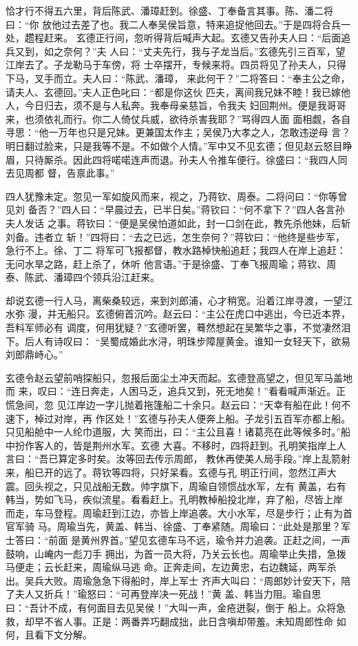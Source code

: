 恰才行不得五六里，背后陈武、潘璋赶到。徐盛、丁奉备言其事。陈、潘二将曰：“你
放他过去差了也。我二人奉吴侯旨意，特来追捉他回去。”于是四将合兵一处，趱程赶来。
玄德正行间，忽听得背后喊声大起。玄德又告孙夫人曰：“后面追兵又到，如之奈何？”夫
人曰：“丈夫先行，我与子龙当后。”玄德先引三百军，望江岸去了。子龙勒马于车傍，将
士卒摆开，专候来将。四员将见了孙夫人，只得下马，叉手而立。夫人曰：“陈武、潘璋，
来此何干？”二将答曰：“奉主公之命，请夫人、玄德回。”夫人正色叱曰：“都是你这伙
匹夫，离间我兄妹不睦！我已嫁他人，今日归去，须不是与人私奔。我奉母亲慈旨，令我夫
妇回荆州。便是我哥哥来，也须依礼而行。你二人倚仗兵威，欲待杀害我耶？”骂得四人面
面相觑，各自寻思：“他一万年也只是兄妹。更兼国太作主；吴侯乃大孝之人，怎敢违逆母
言？明日翻过脸来，只是我等不是。不如做个人情。”军中又不见玄德；但见赵云怒目睁
眉，只待厮杀。因此四将喏喏连声而退。孙夫人令推车便行。徐盛曰：“我四人同去见周都
督，告禀此事。”

四人犹豫未定。忽见一军如旋风而来，视之，乃蒋钦、周泰。二将问曰：“你等曾见刘
备否？”四人曰：“早晨过去，已半日矣。”蒋钦曰：“何不拿下？”四人各言孙夫人发话
之事。蒋钦曰：“便是吴侯怕道如此，封一口剑在此，教先杀他妹，后斩刘备。违者立
斩！”四将曰：“去之已远，怎生奈何？”蒋钦曰：“他终是些步军，急行不上。徐、丁二
将军可飞报都督，教水路棹快船追赶；我四人在岸上追赶：无问水旱之路，赶上杀了，休听
他言语。”于是徐盛、丁奉飞报周瑜；蒋钦、周泰、陈武、潘璋四个领兵沿江赶来。

却说玄德一行人马，离柴桑较远，来到刘郎浦，心才稍宽。沿着江岸寻渡，一望江水弥
漫，并无船只。玄德俯首沉吟。赵云曰：“主公在虎口中逃出，今已近本界，吾料军师必有
调度，何用犹疑？”玄德听罢，蓦然想起在吴繁华之事，不觉凄然泪下。后人有诗叹曰：
“吴蜀成婚此水浔，明珠步障屋黄金。谁知一女轻天下，欲易刘郎鼎峙心。”

玄德令赵云望前哨探船只，忽报后面尘土冲天而起。玄德登高望之，但见军马盖地而
来，叹曰：“连日奔走，人困马乏，追兵又到，死无地矣！”看看喊声渐近。正慌急间，忽
见江岸边一字儿抛着拖篷船二十余只。赵云曰：“天幸有船在此！何不速下，棹过对岸，再
作区处！”玄德与孙夫人便奔上船。子龙引五百军亦都上船。只见船舱中一人纶巾道服，大
笑而出，曰：“主公且喜！诸葛亮在此等候多时。”船中扮作客人的，皆是荆州水军。玄德
大喜。不移时，四将赶到。孔明笑指岸上人言曰：“吾已算定多时矣。汝等回去传示周郎，
教休再使美人局手段。”岸上乱箭射来，船已开的远了。蒋钦等四将，只好呆看。玄德与孔
明正行间，忽然江声大震。回头视之，只见战船无数。帅字旗下，周瑜自领惯战水军，左有
黄盖，右有韩当，势如飞马，疾似流星。看看赶上。孔明教棹船投北岸，弃了船，尽皆上岸
而走，车马登程。周瑜赶到江边，亦皆上岸追袭。大小水军，尽是步行；止有为首官军骑
马。周瑜当先，黄盖、韩当、徐盛、丁奉紧随。周瑜曰：“此处是那里？军士答曰：“前面
是黄州界首。”望见玄德车马不远，瑜令并力追袭。正赶之间，一声鼓响，山崦内一彪刀手
拥出，为首一员大将，乃关云长也。周瑜举止失措，急拨马便走；云长赶来，周瑜纵马逃
命。正奔走间，左边黄忠，右边魏延，两军杀出。吴兵大败。周瑜急急下得船时，岸上军士
齐声大叫曰：“周郎妙计安天下，陪了夫人又折兵！”瑜怒曰：“可再登岸决一死战！”黄
盖、韩当力阻。瑜自思曰：“吾计不成，有何面目去见吴侯！”大叫一声，金疮迸裂，倒于
船上。众将急救，却早不省人事。正是：两番弄巧翻成拙，此日含嗔却带羞。未知周郎性命
如何，且看下文分解。